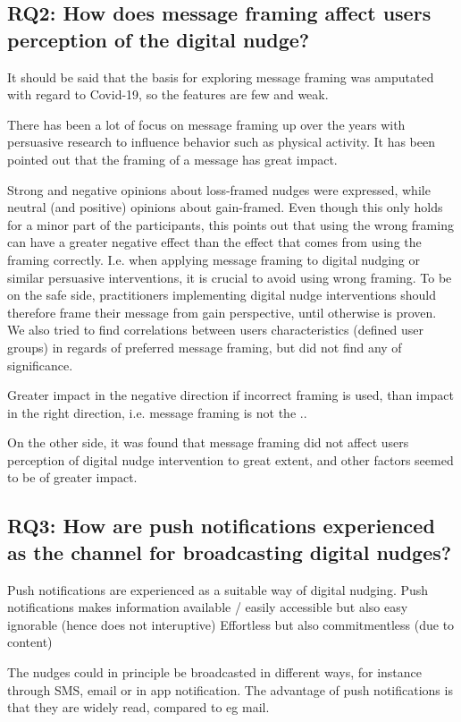 \subsection{RQ2: How does message framing affect users perception of the digital nudge?}

It should be said that the basis for exploring message framing was amputated with regard to Covid-19, so the features are few and weak.

There has been a lot of focus on message framing up over the years with persuasive research to influence behavior such as physical activity. It has been pointed out that the framing of a message has great impact.  

Strong and negative opinions about loss-framed nudges were expressed, while neutral (and positive) opinions about gain-framed. Even though this only holds for a minor part of the participants, this points out that using the wrong framing can have a greater negative effect than the effect that comes from using the framing correctly. I.e. when applying message framing to digital nudging or similar persuasive interventions, it is crucial to avoid using wrong framing. To be on the safe side, practitioners implementing digital nudge interventions should therefore frame their message from gain perspective, until otherwise is proven.  We also tried to find correlations between users characteristics (defined user groups) in regards of preferred message framing, but did not find any of significance. 

Greater impact in the negative direction if incorrect framing is used, than impact in the right direction, i.e. message framing is not the ..

On the other side, it was found that message framing did not affect users perception of digital nudge intervention to great extent, and other factors seemed to be of greater impact. 

\subsection{RQ3: How are push notifications experienced as the channel for broadcasting digital nudges?}

Push notifications are experienced as a suitable way of digital nudging. 
Push notifications makes information available / easily accessible but also easy ignorable (hence does not interuptive)  
Effortless but also commitmentless (due to content)

The nudges could in principle be broadcasted in different ways, for instance through SMS, email or in app notification. The advantage of push notifications is that they are widely read, compared to eg mail.

